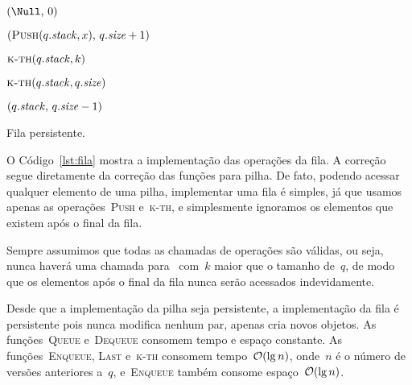\documentclass[main.tex]{subfiles}
\begin{document}
\begin{algorithm}
\begin{algorithmic}[1]
    \State \Return $(\Null,\,0)$
\EndFunction

    \State \Return $(\Call{Push}{q.\V{stack}, x},\,q.\V{size} + 1)$
\EndFunction

    \State \Return $\Call{k-th}{q.\V{stack}, k}$ 
\EndFunction

    \State \Return $\Call{k-th}{q.\V{stack}, q.\V{size}}$ 
\EndFunction

    \State \Return $(q.\mathit{stack},\,q.\mathit{size} - 1)$
\EndFunction

\end{algorithmic}
\caption{Fila persistente.} \label{lst:fila}
\end{algorithm}

O Código~\ref{lst:fila} mostra a implementação das operações da fila. A correção segue diretamente da correção das funções para pilha. De fato, podendo acessar qualquer elemento de uma pilha, implementar uma fila é simples, já que usamos apenas as operações~\textsc{Push} e~\textsc{k-th}, e simplesmente ignoramos os elementos que existem após o final da fila.

Sempre assumimos que todas as chamadas de operações são válidas, ou seja, nunca haverá uma chamada para~ com~$k$ maior que o tamanho de~$q$, de modo que os elementos após o final da fila nunca serão acessados indevidamente.

Desde que a implementação da pilha seja persistente, a implementação da fila é persistente pois nunca modifica nenhum par, apenas cria novos objetos. As funções~\textsc{Queue} e~\textsc{Dequeue} consomem tempo e espaço constante. As funções~\textsc{Enqueue}, \textsc{Last} e~\textsc{k-th} consomem tempo~$\mathcal{O}(\lg n)$, onde~$n$ é o número de versões anteriores a~$q$, e~\textsc{Enqueue} também consome espaço~$\mathcal{O}(\lg n)$.
\end{document}
